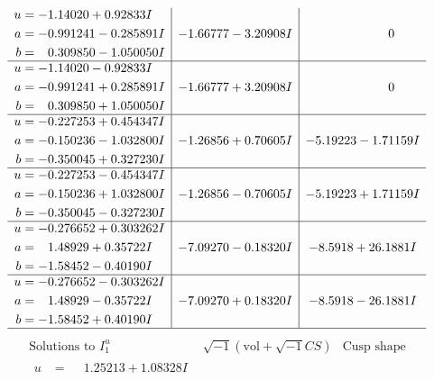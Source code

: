 \documentclass[1p]{elsarticle_modified}
\theoremstyle{definition}
\newcommand{\I}{\sqrt{-1}}
\begin{document}
$$\begin{array}{c|c|c}
\begin{aligned}
u &= -1.14020 + 0.92833 I \\
a &= -0.991241 - 0.285891 I \\
b &= \phantom{-}0.309850 - 1.050050 I\end{aligned}
 & -1.66777 - 3.20908 I & \phantom{-0.000000 } 0 \\ \hline\begin{aligned}
u &= -1.14020 - 0.92833 I \\
a &= -0.991241 + 0.285891 I \\
b &= \phantom{-}0.309850 + 1.050050 I\end{aligned}
 & -1.66777 + 3.20908 I & \phantom{-0.000000 } 0 \\ \hline\begin{aligned}
u &= -0.227253 + 0.454347 I \\
a &= -0.150236 - 1.032800 I \\
b &= -0.350045 + 0.327230 I\end{aligned}
 & -1.26856 + 0.70605 I & -5.19223 - 1.71159 I \\ \hline\begin{aligned}
u &= -0.227253 - 0.454347 I \\
a &= -0.150236 + 1.032800 I \\
b &= -0.350045 - 0.327230 I\end{aligned}
 & -1.26856 - 0.70605 I & -5.19223 + 1.71159 I \\ \hline\begin{aligned}
u &= -0.276652 + 0.303262 I \\
a &= \phantom{-}1.48929 + 0.35722 I \\
b &= -1.58452 - 0.40190 I\end{aligned}
 & -7.09270 - 0.18320 I & -8.5918 + 26.1881 I \\ \hline\begin{aligned}
u &= -0.276652 - 0.303262 I \\
a &= \phantom{-}1.48929 - 0.35722 I \\
b &= -1.58452 + 0.40190 I\end{aligned}
 & -7.09270 + 0.18320 I & -8.5918 - 26.1881 I\\
 \hline 
 \end{array}$$\newpage$$\begin{array}{c|c|c}  
\text{Solutions to }I^u_{1}& \I (\text{vol} + \sqrt{-1}CS) & \text{Cusp shape}\\
 \hline 
\begin{aligned}
u &= \phantom{-}1.25213 + 1.08328 I \\

\end{aligned}
\end{array}$$
\end{document}
